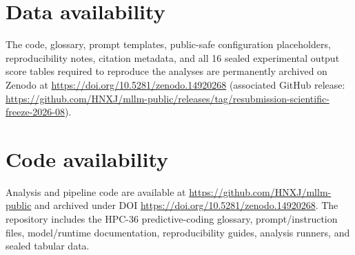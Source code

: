 \documentclass[12pt]{article}
\begin{document}
\section*{Data availability}\label{data-availability}
The code, glossary, prompt templates, public-safe configuration placeholders, reproducibility notes, citation metadata, and all 16 sealed experimental output score tables required to reproduce the analyses are permanently archived on Zenodo at \url{https://doi.org/10.5281/zenodo.14920268} (associated GitHub release: \url{https://github.com/HNXJ/mllm-public/releases/tag/resubmission-scientific-freeze-2026-08}).

\section*{Code availability}\label{code-availability}
Analysis and pipeline code are available at \url{https://github.com/HNXJ/mllm-public} and archived under DOI \url{https://doi.org/10.5281/zenodo.14920268}. The repository includes the HPC-36 predictive-coding glossary, prompt/instruction files, model/runtime documentation, reproducibility guides, analysis runners, and sealed tabular data.
\end{document}
